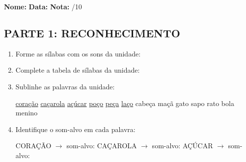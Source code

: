\begin{exercicio}

\noindent\textbf{Nome:} \underline{\hspace{3.2cm}} \quad \textbf{Data:} \underline{\hspace{1.6cm}} \quad \textbf{Nota:} \underline{\hspace{0.9cm}}/10


\subsection*{PARTE 1: RECONHECIMENTO}

\begin{enumerate}

  \item Forme as sílabas com os sons da unidade:

\begin{center}
\end{center}

  \item Complete a tabela de sílabas da unidade:

\begin{center}
\end{center}

  \item Sublinhe as palavras da unidade:

\begin{center}
  \uline{coração} \quad \uline{caçarola} \quad \uline{açúcar} \quad \uline{poço} \quad \uline{peça} \quad \uline{laço} \quad cabeça \quad maçã \quad gato \quad sapo \quad rato \quad bola \quad menino
\end{center}

  \item Identifique o som-alvo em cada palavra:
  \begin{center}
  CORAÇÃO $\rightarrow$ som-alvo: \underline{\hspace{1cm}} \quad CAÇAROLA $\rightarrow$ som-alvo: \underline{\hspace{1cm}} \quad AÇÚCAR $\rightarrow$ som-alvo: \underline{\hspace{1cm}}
  \end{center}


\end{enumerate}
\end{exercicio}
